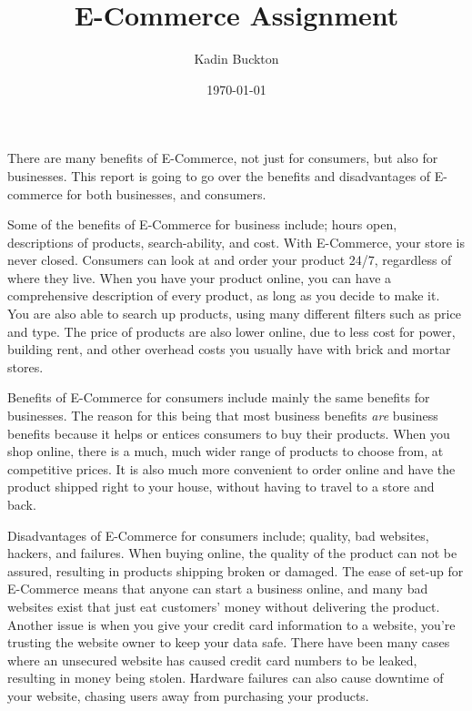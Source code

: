 \documentclass[11pt]{article}
\author{Kadin Buckton}
\date{\today}
\title{E-Commerce Assignment}
\begin{document}
\maketitle
There are many benefits of E-Commerce, not just for consumers, but also for businesses. This report is going to go over the benefits and disadvantages of E-commerce for both businesses, and consumers.

Some of the benefits of E-Commerce for business include; hours open, descriptions of products, search-ability, and cost. With E-Commerce, your store is never closed. Consumers can look at and order your product 24/7, regardless of where they live. When you have your product online, you can have a comprehensive description of every product, as long as you decide to make it. You are also able to search up products, using many different filters such as price and type. The price of products are also lower online, due to less cost for power, building rent, and other overhead costs you usually have with brick and mortar stores.

Benefits of E-Commerce for consumers include mainly the same benefits for businesses. The reason for this being that most business benefits \emph{are} business benefits because it helps or entices consumers to buy their products. When you shop online, there is a much, much wider range of products to choose from, at competitive prices. It is also much more convenient to order online and have the product shipped right to your house, without having to travel to a store and back.

Disadvantages of E-Commerce for consumers include; quality, bad websites, hackers, and failures. When buying online, the quality of the product can not be assured, resulting in products shipping broken or damaged. The ease of set-up for E-Commerce means that anyone can start a business online, and many bad websites exist that just eat customers' money without delivering the product. Another issue is when you give your credit card information to a website, you're trusting the website owner to keep your data safe. There have been many cases where an unsecured website has caused credit card numbers to be leaked, resulting in money being stolen. Hardware failures can also cause downtime of your website, chasing users away from purchasing your products.
\end{document}
